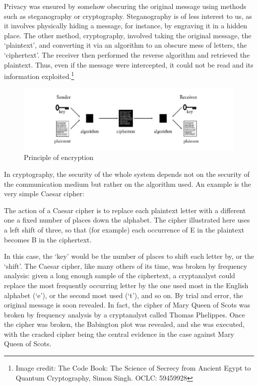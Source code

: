 \documentclass[titlepage]{article}
\begin{document}
Privacy was ensured by somehow obscuring the original message using methods such as steganography or
cryptography. Steganography is of less interest to us, as it involves physically hiding a message,
for instance, by engraving it in a hidden place. The other method, cryptography, involved taking the
original message, the `plaintext', and converting it via an algorithm to an obscure mess of letters,
the `ciphertext'. The receiver then performed the reverse algorithm and retrieved the plaintext.
Thus, even if the message were intercepted, it could not be read and its information exploited.\footnote{Image
credit: The Code Book: The Science of Secrecy from Ancient Egypt to Quantum Cryptography, Simon
Singh. OCLC: 59459928}

\begin{figure}[H]
  \centering
  \includegraphics[scale=0.3]{cryp.png}
  \caption{Principle of encryption}
\end{figure}

In cryptography, the security of the whole system depends not on the security of the communication
medium but rather on the algorithm used. An example is the very simple Caesar cipher\cite{caesar}:

\begin{displayquote}
  The action of a Caesar cipher is to replace each plaintext letter with a different one a fixed
number of places down the alphabet. The cipher illustrated here uses a left shift of three, so that
(for example) each occurrence of E in the plaintext becomes B in the ciphertext.
\end{displayquote}


In this case, the `key' would be the number of places to shift each letter by, or the `shift'. The
Caesar cipher, like many others of its time, was broken by frequency analysis: given a long enough
sample of the ciphertext, a cryptanalyst could replace the most frequently occurring letter by the
one used most in the English alphabet (`e'), or the second most used (`t'), and so on. By trial and
error, the original message is soon revealed. In fact, the cipher of Mary Queen of Scots was broken
by frequency analysis by a cryptanalyst called Thomas Phelippes. Once the cipher was broken, the
Babington plot was revealed, and she was executed, with the cracked cipher being the central
evidence in the case against Mary Queen of Scots.
\end{document}
